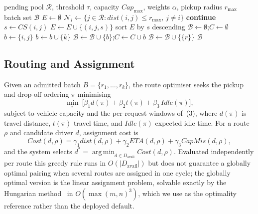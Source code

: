 \documentclass[conference]{IEEEtran}
\DeclareMathOperator*{\argmin}{arg\,min}
\begin{document}
\begin{algorithm}[t]
\caption{Feasibility-first batch formation}
\label{alg:batch}
\small
\begin{algorithmic}[1]
\Require pending pool $\mathcal{R}$, threshold $\tau$, capacity $Cap_{\max}$,
weights $\alpha$, pickup radius $r_{\max}$
\Ensure batch set $\mathcal{B}$
\State $E \gets \emptyset$
  \State $\mathcal{N}_i \gets \{j \in \mathcal{R} : dist(i,j) \le r_{\max},\, j \ne i\}$
     \State \textbf{continue}
    \EndIf
    \State $s \gets CS(i,j)$ 
     \State $E \gets E \cup \{(i,j,s)\}$ \EndIf
  \EndFor
\EndFor
\State sort $E$ by $s$ descending
\State $\mathcal{B} \gets \emptyset$;\quad $C \gets \emptyset$
    \State $b \gets \{i,j\}$
      \State $b \gets b \cup \{k\}$
    \EndWhile
    \State $\mathcal{B} \gets \mathcal{B} \cup \{b\}$;\quad $C \gets C \cup b$
  \EndIf
\EndFor
{}
  \State $\mathcal{B} \gets \mathcal{B} \cup \{\{r\}\}$
\EndFor
\State \Return $\mathcal{B}$
\end{algorithmic}
\end{algorithm}

\subsection{Routing and Assignment}
Given an admitted batch $B=\{r_1,\dots,r_k\}$, the route optimiser seeks the
pickup and drop-off ordering $\pi$ minimising
\begin{equation}
\min_\pi\ \bigl[\beta_1 d(\pi)+\beta_2 t(\pi)+\beta_3\,\mathit{Idle}(\pi)\bigr],
\end{equation}
subject to vehicle capacity and the per-request windows of~(3), where
$d(\pi)$ is travel distance, $t(\pi)$ travel time, and $\mathit{Idle}(\pi)$
expected idle time. For a route $\rho$ and candidate driver $d$, assignment
cost is
\begin{equation}
\mathit{Cost}(d,\rho)=\gamma_1 \mathit{dist}(d,\rho)+\gamma_2 \mathit{ETA}(d,\rho)
                     +\gamma_3 \mathit{CapMis}(d,\rho),
\end{equation}
and the system selects
$d^{*}=\argmin_{d\in D_{\text{avail}}}\mathit{Cost}(d,\rho)$.
Evaluated independently per route this greedy rule runs in
$O(|D_{\text{avail}}|)$ but does not guarantee a globally optimal pairing
when several routes are assigned in one cycle; the globally optimal version
is the linear assignment problem, solvable exactly by the Hungarian
method~\cite{kuhn1955} in $O(\max(m,n)^3)$, which we use as the optimality
reference rather than the deployed default.
\end{document}
